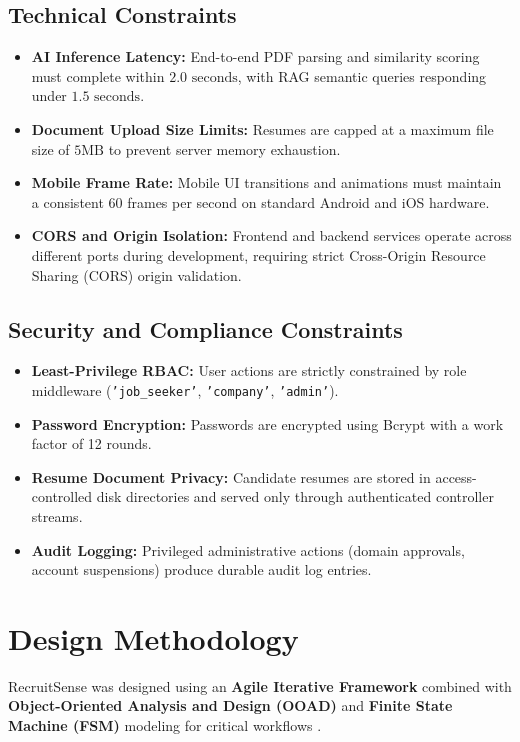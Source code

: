 \subsection{Technical Constraints}
\begin{itemize}
    \item \textbf{AI Inference Latency:} End-to-end PDF parsing and similarity scoring must complete within $2.0\text{ seconds}$, with RAG semantic queries responding under $1.5\text{ seconds}$.
    \item \textbf{Document Upload Size Limits:} Resumes are capped at a maximum file size of $5\text{MB}$ to prevent server memory exhaustion.
    \item \textbf{Mobile Frame Rate:} Mobile UI transitions and animations must maintain a consistent 60 frames per second on standard Android and iOS hardware.
    \item \textbf{CORS and Origin Isolation:} Frontend and backend services operate across different ports during development, requiring strict Cross-Origin Resource Sharing (CORS) origin validation.
\end{itemize}

\subsection{Security and Compliance Constraints}
\begin{itemize}
    \item \textbf{Least-Privilege RBAC:} User actions are strictly constrained by role middleware (\texttt{'job\_seeker'}, \texttt{'company'}, \texttt{'admin'}).
    \item \textbf{Password Encryption:} Passwords are encrypted using Bcrypt with a work factor of 12 rounds.
    \item \textbf{Resume Document Privacy:} Candidate resumes are stored in access-controlled disk directories and served only through authenticated controller streams.
    \item \textbf{Audit Logging:} Privileged administrative actions (domain approvals, account suspensions) produce durable audit log entries.
\end{itemize}

\section{Design Methodology}
RecruitSense was designed using an \textbf{Agile Iterative Framework} combined with \textbf{Object-Oriented Analysis and Design (OOAD)} and \textbf{Finite State Machine (FSM)} modeling for critical workflows \cite{sommerville2016software}.

